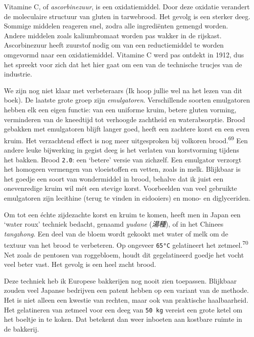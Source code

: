 \documentclass[
  11pt,
  dutch,
]{memoir}
\begin{document}
Vitamine C, of \emph{ascorbinezuur}, is een oxidatiemiddel. Door deze
oxidatie verandert de moleculaire structuur van gluten in tarwebrood.
Het gevolg is een sterker deeg. Sommige middelen reageren snel, zodra
alle ingrediënten gemengd worden. Andere middelen zoals kaliumbromaat
worden pas wakker in de rijskast. Ascorbinezuur heeft zuurstof nodig om
van een reductiemiddel te worden omgevormd naar een oxidatiemiddel.
Vitamine C werd pas ontdekt in 1912, dus het spreekt voor zich dat het
hier gaat om een van de technische trucjes van de industrie.

We zijn nog niet klaar met verbeteraars (Ik hoop jullie wel na het lezen
van dit boek). De laatste grote groep zijn \emph{emulgatoren}.
Verschillende soorten emulgatoren hebben elk een eigen functie: van een
uniforme kruim, betere gluten vorming, verminderen van de kneedtijd tot
verhoogde zachtheid en waterabsorptie. Brood gebakken met emulgatoren
blijft langer goed, heeft een zachtere korst en een even kruim. Het
verzachtend effect is nog meer uitgesproken bij volkoren
brood.\textsuperscript{69} Een andere leuke bijwerking in gegist deeg is
het verlaten van korstvorming tijdens het bakken. Brood \texttt{2.0}:
een `betere' versie van zichzelf. Een emulgator verzorgt het homogeen
vermengen van vloeistoffen en vetten, zoals in melk. Blijkbaar is het
goedje een soort van wondermiddel in brood, behalve dat ik juist een
onevenredige kruim wil mét een stevige korst. Voorbeelden van veel
gebruikte emulgatoren zijn lecithine (terug te vinden in eidooiers) en
mono- en diglyceriden.

Om tot een échte zijdezachte korst en kruim te komen, heeft men in Japan
een `water roux' techniek bedacht, genaamd \emph{yudane} (\emph{湯種}),
of in het Chinees \emph{tangzhong}. Een deel van de bloem wordt gekookt
met water of melk om de textuur van het brood te verbeteren. Op ongeveer
\texttt{65°C} gelatineert het zetmeel.\textsuperscript{70} Net zoals de
pentosen van roggebloem, houdt dit gegelatineerd goedje het vocht veel
beter vast. Het gevolg is een heel zacht brood.

Deze techniek heb ik Europese bakkerijen nog nooit zien toepassen.
Blijkbaar zouden veel Japanse bedrijven een patent hebben op een variant
van de methode. Het is niet alleen een kwestie van rechten, maar ook van
praktische haalbaarheid. Het gelatineren van zetmeel voor een deeg van
\texttt{50\ kg} vereist een grote ketel om het boeltje in te koken. Dat
betekent dan weer inboeten aan kostbare ruimte in de bakkerij.
\end{document}
